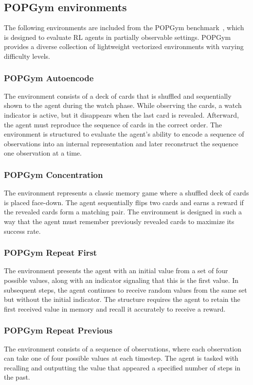 \subsection{POPGym environments}

The following environments are included from the POPGym benchmark~\citep{popgym2023}, which is designed to evaluate RL agents in partially observable settings. POPGym provides a diverse collection of lightweight vectorized environments with varying difficulty levels.

\subsubsection{POPGym Autoencode}

The environment consists of a deck of cards that is shuffled and sequentially shown to the agent during the watch phase. While observing the cards, a watch indicator is active, but it disappears when the last card is revealed. Afterward, the agent must reproduce the sequence of cards in the correct order. The environment is structured to evaluate the agent's ability to encode a sequence of observations into an internal representation and later reconstruct the sequence one observation at a time.


\subsubsection{POPGym Concentration}

The environment represents a classic memory game where a shuffled deck of cards is placed face-down. The agent sequentially flips two cards and earns a reward if the revealed cards form a matching pair. The environment is designed in such a way that the agent must remember previously revealed cards to maximize its success rate.

\subsubsection{POPGym Repeat First}
The environment presents the agent with an initial value from a set of four possible values, along with an indicator signaling that this is the first value. In subsequent steps, the agent continues to receive random values from the same set but without the initial indicator. The structure requires the agent to retain the first received value in memory and recall it accurately to receive a reward.

\subsubsection{POPGym Repeat Previous}
The environment consists of a sequence of observations, where each observation can take one of four possible values at each timestep. The agent is tasked with recalling and outputting the value that appeared a specified number of steps in the past.

